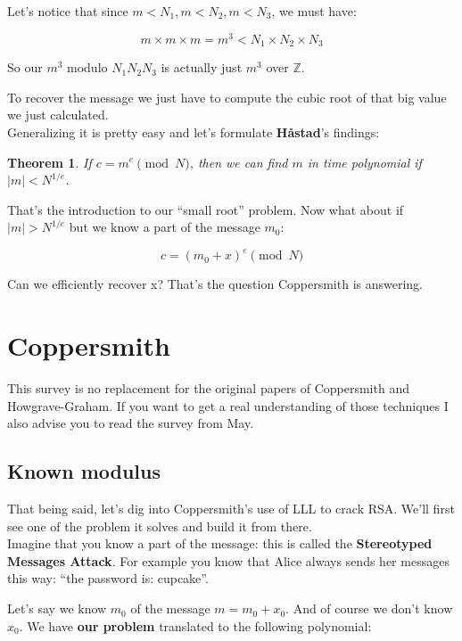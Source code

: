 \documentclass[a4paper,11pt]{article}
\newtheorem{theorem}{Theorem}
\begin{document}
Let's notice that since  $m < N_1, m < N_2, m < N_3$, we must have:

\[ m \times m \times m = m^3 < N_1 \times N_2 \times N_3 \]

So our $m^3$ modulo $N_1 N_2 N_3$ is actually just $m^3$ over $\mathbb{Z}$. 

To recover the message we just have to compute the cubic root of that big value we just calculated.\\

Generalizing it is pretty easy and let's formulate \textbf{Håstad}'s findings:

\begin{theorem}
If $c = m^e \pmod{N}$, then we can find $m$ in time polynomial if $|m| < N^{1/e}$.
\end{theorem}

That's the introduction to our ``small root'' problem. Now what about if $|m| > N^{1/e}$ but we know a part of the message $m_0$:

\[ c = (m_0 + x)^e \pmod{N} \]

Can we efficiently recover x? That's the question Coppersmith is answering.


\section{Coppersmith}\label{coppersmith}

This survey is no replacement for the original papers of Coppersmith\cite{coppersmith} and Howgrave-Graham\cite{howgrave-graham}. If you want to get a real understanding of those techniques I also advise you to read the survey from May\cite{may}.

\subsection{Known modulus}\label{knownmodulus}

That being said, let's dig into Coppersmith's use of LLL to crack RSA. We'll first see one of the problem it solves and build it from there.\\
Imagine that you know a part of the message: this is called the \textbf{Stereotyped Messages Attack}. For example you know that Alice always sends her messages this way: ``the password is: cupcake''.

Let's say we know $m_0$ of the message $m = m_0 + x_0$. And of course we don't know $x_0$. We have \textbf{our problem} translated to the following polynomial:
\end{document}
